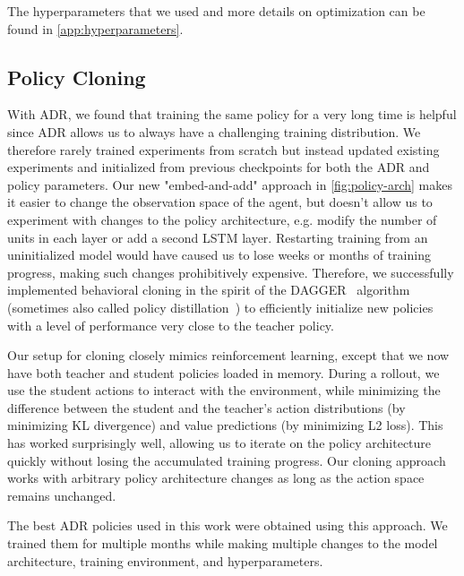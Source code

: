 The hyperparameters that we used and more details on optimization can be found in \autoref{app:hyperparameters}.


\subsection{Policy Cloning}
With ADR, we found that training the same policy for a very long time is helpful since ADR allows us to always have a challenging training distribution. We therefore rarely trained experiments from scratch but instead updated existing experiments and initialized from previous checkpoints for both the ADR and policy parameters. 
Our new "embed-and-add" approach in \autoref{fig:policy-arch} makes it easier to change the observation space of the agent, but doesn't allow us to experiment with changes to the policy architecture, e.g. modify the number of units in each layer or add a second LSTM layer. 
Restarting training from an uninitialized model would have caused us to lose weeks or months of training progress, making such changes prohibitively expensive. 
Therefore, we successfully implemented behavioral cloning in the spirit of the DAGGER~\citep{ross2010dagger} algorithm (sometimes also called policy distillation~\citep{Czarnecki2019DistillingPD}) to efficiently initialize new policies with a level of performance very close to the teacher policy.

Our setup for cloning closely mimics reinforcement learning, except that we now have both teacher and student policies loaded in memory. During a rollout, we use the student actions to interact with the environment, while minimizing the difference between the student and the teacher's action distributions (by minimizing KL divergence) and value predictions (by minimizing L2 loss). This has worked surprisingly well, allowing us to iterate on the policy architecture quickly without losing the accumulated training progress. Our cloning approach works with arbitrary policy architecture changes as long as the action space remains unchanged.

The best ADR policies used in this work were obtained using this approach. We trained them for multiple months while making multiple changes to the model architecture, training environment, and hyperparameters.
